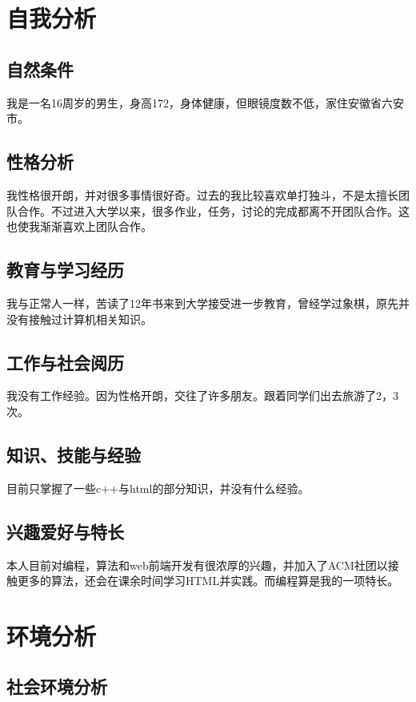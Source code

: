 \documentclass{article}
\begin{document}
\thispagestyle{empty}
\newpage
\setcounter{page}{1}
\section{自我分析}

\subsection{自然条件}
我是一名16周岁的男生，身高172，身体健康，但眼镜度数不低，家住安徽省六安市。 \par
\subsection{性格分析}
我性格很开朗，并对很多事情很好奇。过去的我比较喜欢单打独斗，不是太擅长团队合作。不过进入大学以来，很多作业，任务，讨论的完成都离不开团队合作。这也使我渐渐喜欢上团队合作。\par
\subsection{教育与学习经历}
我与正常人一样，苦读了12年书来到大学接受进一步教育，曾经学过象棋，原先并没有接触过计算机相关知识。\par
\subsection{工作与社会阅历}
我没有工作经验。因为性格开朗，交往了许多朋友。跟着同学们出去旅游了2，3次。\par
\subsection{知识、技能与经验}
目前只掌握了一些c++与html的部分知识，并没有什么经验。\par
\subsection{兴趣爱好与特长}
本人目前对编程，算法和web前端开发有很浓厚的兴趣，并加入了ACM社团以接触更多的算法，还会在课余时间学习HTML并实践。而编程算是我的一项特长。\par
\section{环境分析}


\subsection{社会环境分析}\par
\end{document}
